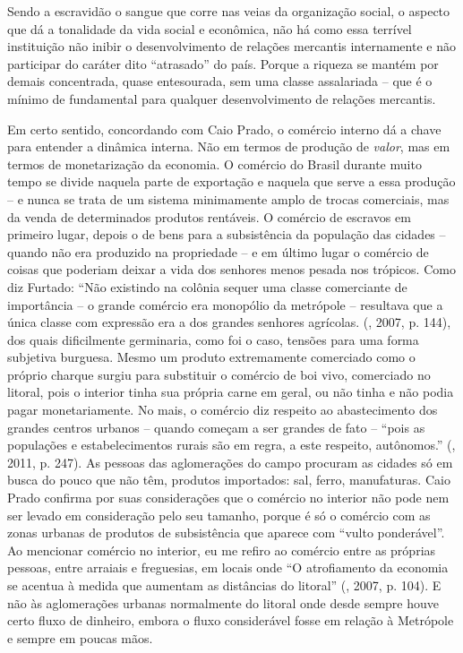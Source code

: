 Sendo a escravidão o sangue que corre nas veias da organização social, o
aspecto que dá a tonalidade da vida social e econômica, não há como essa
terrível instituição não inibir o desenvolvimento de relações mercantis
internamente e não participar do caráter dito ``atrasado'' do país.
Porque a riqueza se mantém por demais concentrada, quase entesourada,
sem uma classe assalariada -- que é o mínimo de fundamental para
qualquer desenvolvimento de relações mercantis.

Em certo sentido, concordando com Caio Prado, o comércio interno dá a
chave para entender a dinâmica interna. Não em termos de produção de
\emph{valor}, mas em termos de monetarização da economia. O comércio do
Brasil durante muito tempo se divide naquela parte de exportação e
naquela que serve a essa produção -- e nunca se trata de um sistema
minimamente amplo de trocas comerciais, mas da venda de determinados
produtos rentáveis. O comércio de escravos em primeiro lugar, depois o
de bens para a subsistência da população das cidades -- quando não era
produzido na propriedade -- e em último lugar o comércio de coisas que
poderiam deixar a vida dos senhores menos pesada nos trópicos. Como diz
Furtado: ``Não existindo na colônia sequer uma classe comerciante de
importância -- o grande comércio era monopólio da metrópole -- resultava
que a única classe com expressão era a dos grandes senhores agrícolas.
(, 2007, p. 144), dos quais dificilmente germinaria, como foi o
caso, tensões para uma forma subjetiva burguesa. Mesmo um produto
extremamente comerciado como o próprio charque surgiu para substituir o
comércio de boi vivo, comerciado no litoral, pois o interior tinha sua
própria carne em geral, ou não tinha e não podia pagar monetariamente.
No mais, o comércio diz respeito ao abastecimento dos grandes centros
urbanos -- quando começam a ser grandes de fato -- ``pois as populações
e estabelecimentos rurais são em regra, a este respeito, autônomos.''
(, 2011, p. 247). As pessoas das aglomerações do campo procuram as
cidades só em busca do pouco que não têm, produtos importados: sal,
ferro, manufaturas. Caio Prado confirma por suas considerações que o
comércio no interior não pode nem ser levado em consideração pelo seu
tamanho, porque é só o comércio com as zonas urbanas de produtos de
subsistência que aparece com ``vulto ponderável''. Ao mencionar comércio
no interior, eu me refiro ao comércio entre as próprias pessoas, entre
arraiais e freguesias, em locais onde ``O atrofiamento da economia se
acentua à medida que aumentam as distâncias do litoral'' (, 2007,
p. 104). E não às aglomerações urbanas normalmente do litoral onde desde
sempre houve certo fluxo de dinheiro, embora o fluxo considerável fosse
em relação à Metrópole e sempre em poucas mãos.

